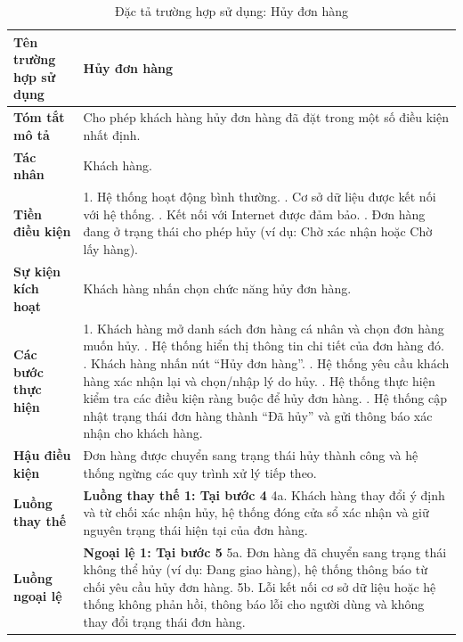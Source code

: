 {
\begin{longtable}{|>{\bfseries}p{4cm}|p{11.5cm}|}
\caption{Đặc tả trường hợp sử dụng: Hủy đơn hàng}
\label{tab:uc-cancel-order} \\
\hline
\textbf{Tên trường hợp sử dụng} & Hủy đơn hàng \\
\hline
\textbf{Tóm tắt mô tả} & Cho phép khách hàng hủy đơn hàng đã đặt trong một số điều kiện nhất định. \\
\hline
\textbf{Tác nhân} & Khách hàng. \\
\hline
\textbf{Tiền điều kiện} & 1. Hệ thống hoạt động bình thường. \newline
2. Cơ sở dữ liệu được kết nối với hệ thống. \newline
3. Kết nối với Internet được đảm bảo. \newline
4. Đơn hàng đang ở trạng thái cho phép hủy (ví dụ: Chờ xác nhận hoặc Chờ lấy hàng). \\
\hline
\textbf{Sự kiện kích hoạt} & Khách hàng nhấn chọn chức năng hủy đơn hàng. \\
\hline
\textbf{Các bước thực hiện} & 1. Khách hàng mở danh sách đơn hàng cá nhân và chọn đơn hàng muốn hủy. \newline
2. Hệ thống hiển thị thông tin chi tiết của đơn hàng đó. \newline
3. Khách hàng nhấn nút “Hủy đơn hàng”. \newline
4. Hệ thống yêu cầu khách hàng xác nhận lại và chọn/nhập lý do hủy. \newline
5. Hệ thống thực hiện kiểm tra các điều kiện ràng buộc để hủy đơn hàng. \newline
6. Hệ thống cập nhật trạng thái đơn hàng thành “Đã hủy” và gửi thông báo xác nhận cho khách hàng. \\
\hline
\textbf{Hậu điều kiện} & Đơn hàng được chuyển sang trạng thái hủy thành công và hệ thống ngừng các quy trình xử lý tiếp theo. \\
\hline
\textbf{Luồng thay thế} & \textbf{Luồng thay thế 1: Tại bước 4} \newline
4a. Khách hàng thay đổi ý định và từ chối xác nhận hủy, hệ thống đóng cửa sổ xác nhận và giữ nguyên trạng thái hiện tại của đơn hàng. \\
\hline
\textbf{Luồng ngoại lệ} & \textbf{Ngoại lệ 1: Tại bước 5} \newline
5a. Đơn hàng đã chuyển sang trạng thái không thể hủy (ví dụ: Đang giao hàng), hệ thống thông báo từ chối yêu cầu hủy đơn hàng. \newline
5b. Lỗi kết nối cơ sở dữ liệu hoặc hệ thống không phản hồi, thông báo lỗi cho người dùng và không thay đổi trạng thái đơn hàng. \\
\hline
\end{longtable}

}
